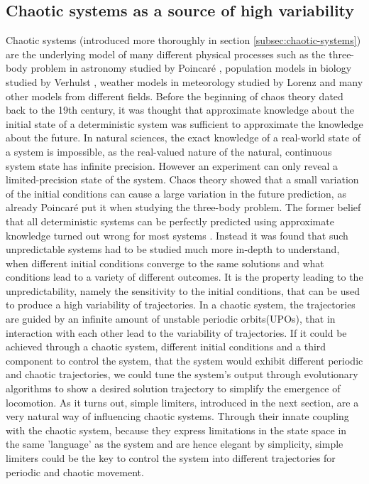 \documentclass[main]{subfiles}
\begin{document}
\subsection{Chaotic systems as a source of high variability}

Chaotic systems (introduced more thoroughly in section \ref{subsec:chaotic-systems}) are the underlying model of many different physical processes such as the three-body problem in astronomy studied by Poincaré \cite{bib:Poincare1892}, population models in biology studied by Verhulst \cite{bib:Verhulst1838}, weather models in meteorology studied by Lorenz \cite{bib:Lorenz1963} and many other models from different fields. %
%
Before the beginning of chaos theory dated back to the 19th century, it was thought that approximate knowledge about the initial state of a deterministic system was sufficient to approximate the knowledge about the future. In natural sciences, the exact knowledge of a real-world state of a system is impossible, as the real-valued nature of the natural, continuous system state has infinite precision. %
%
However an experiment can only reveal a limited-precision state of the system. %
%
Chaos theory showed that a small variation of the initial conditions can cause a large variation in the future prediction, as already Poincaré put it when studying the three-body problem. %
%
The former belief that all deterministic systems can be perfectly predicted using approximate knowledge turned out wrong for most systems \cite{bib:Motter2013}. %
%
Instead it was found that such unpredictable systems had to be studied much more in-depth to understand, when different initial conditions converge to the same solutions and what conditions lead to a variety of different outcomes. %
%
It is the property leading to the unpredictability, namely the sensitivity to the initial conditions, that can be used to produce a high variability of trajectories. %
%
In a chaotic system, the trajectories are guided by an infinite amount of unstable periodic orbits(UPOs), that in interaction with each other lead to the variability of trajectories. %
%
If it could be achieved through a chaotic system, different initial conditions and a third component to control the system, that the system would exhibit different periodic and chaotic trajectories, we could tune the system's output through evolutionary algorithms to show a desired solution trajectory to simplify the emergence of locomotion. %
%
As it turns out, simple limiters, introduced in the next section, are a very natural way of influencing chaotic systems. %
%
Through their innate coupling with the chaotic system, because they express limitations in the state space in the same 'language' as the system and are hence elegant by simplicity, simple limiters could be the key to control the system into different trajectories for periodic and chaotic movement. %
\end{document}
